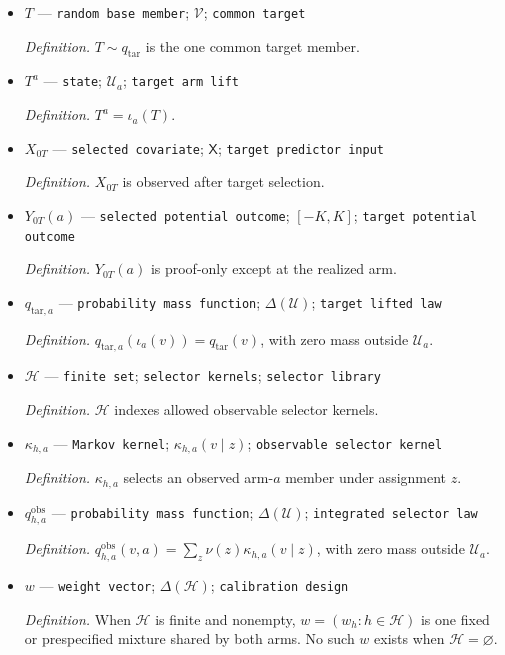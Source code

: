 \documentclass{article}
\begin{document}
\begin{itemize}
  \item \(T\) --- \texttt{random base member}; \(\mathcal V\); \texttt{common target}
  \par\smallskip\noindent\emph{Definition.} \(T\sim q_{\mathrm{tar}}\) is the one common target member.
  \item \(T^a\) --- \texttt{state}; \(\mathcal U_a\); \texttt{target arm lift}
  \par\smallskip\noindent\emph{Definition.} \(T^a=\iota_a(T)\).
  \item \(X_{0T}\) --- \texttt{selected covariate}; \(\mathsf X\); \texttt{target predictor input}
  \par\smallskip\noindent\emph{Definition.} \(X_{0T}\) is observed after target selection.
  \item \(Y_{0T}(a)\) --- \texttt{selected potential outcome}; \([-K,K]\); \texttt{target potential outcome}
  \par\smallskip\noindent\emph{Definition.} \(Y_{0T}(a)\) is proof-only except at the realized arm.
  \item \(q_{\mathrm{tar},a}\) --- \texttt{probability mass function}; \(\Delta(\mathcal U)\); \texttt{target lifted law}
  \par\smallskip\noindent\emph{Definition.} \(q_{\mathrm{tar},a}(\iota_a(v))=q_{\mathrm{tar}}(v)\), with zero mass outside \(\mathcal U_a\).
  \item \(\mathcal H\) --- \texttt{finite set}; \texttt{selector kernels}; \texttt{selector library}
  \par\smallskip\noindent\emph{Definition.} \(\mathcal H\) indexes allowed observable selector kernels.
  \item \(\kappa_{h,a}\) --- \texttt{Markov kernel}; \(\kappa_{h,a}(v\mid z)\); \texttt{observable selector kernel}
  \par\smallskip\noindent\emph{Definition.} \(\kappa_{h,a}\) selects an observed arm-\(a\) member under assignment \(z\).
  \item \(q^{\mathrm{obs}}_{h,a}\) --- \texttt{probability mass function}; \(\Delta(\mathcal U)\); \texttt{integrated selector law}
  \par\smallskip\noindent\emph{Definition.} \(q^{\mathrm{obs}}_{h,a}(v,a)=\sum_z\nu(z)\kappa_{h,a}(v\mid z)\), with zero mass outside \(\mathcal U_a\).
  \item \(w\) --- \texttt{weight vector}; \(\Delta(\mathcal H)\); \texttt{calibration design}
  \par\smallskip\noindent\emph{Definition.} When \(\mathcal H\) is finite and nonempty, \(w=(w_h:h\in\mathcal H)\) is one fixed or prespecified mixture shared by both arms. No such \(w\) exists when \(\mathcal H=\varnothing\).

\end{itemize}
\end{document}
